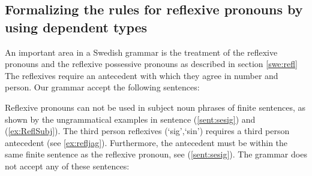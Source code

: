 \documentclass[10pt, a4paper]{article}
\begin{document}
\subsection{Formalizing the rules for reflexive pronouns by using dependent types}
\label{sec:reflexives}
An important area in a Swedish grammar is the treatment of the reflexive pronouns and
the reflexive possessive pronouns as described in section \ref{swe:refl} 
The reflexives require an antecedent with which they agree in
number and person.
Our grammar accept the following sentences:

\label{ex:ReflPredet}
\label{ex:ReflConj} \label{ex:ReflConj2}
Reflexive pronouns can not be used in subject noun phrases of finite sentences,
as shown by the ungrammatical examples in 
sentence (\ref{sent:sesig}) and (\ref{ex:ReflSubj}).
The third person reflexives (`sig',`sin') requires a third person antecedent (see \ref{ex:refljag}).
Furthermore, the antecedent must be within the same finite sentence as the reflexive
pronoun, see (\ref{sent:sesig}).
The grammar does not accept any of these sentences:
\label{ex:ReflSubj}
\label{ex:refljag}
\label{sent:sesig}
\end{document}
